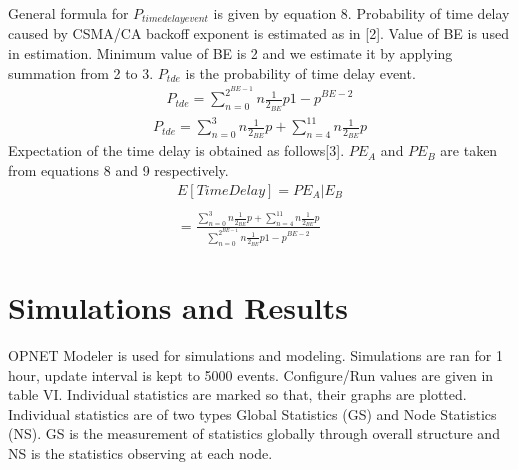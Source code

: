 \documentclass[11pt, conference, compsocconf, onecolumn]{IEEEtran}
\begin{document}
\indent General formula for $P_{time delay event}$ is given by equation 8. Probability of time delay caused by CSMA/CA backoff exponent is estimated as in [2]. Value of BE is used in estimation. Minimum value of BE is 2 and we estimate it by applying summation from 2 to 3. $P_{tde}$ is the probability of time delay event.
\\
\begin{eqnarray}
P_{tde}= \sum_{n=0}^{2^{BE-1}} n\frac{1}{2_{BE}}p{1-p}^{BE-2}
\end{eqnarray}
\begin{eqnarray}
P_{tde}= \sum_{n=0}^{3} n\frac{1}{2_{BE}}p + \sum _{n=4}^{11} n\frac{1}{2_{BE}}p
\end{eqnarray}
\indent Expectation of the time delay is obtained as follows[3]. $P{E_{A}}$ and $P{E_{B}}$ are taken from equations 8 and 9 respectively.
\\
\begin{eqnarray}
E[Time Delay]=P{E_{A}|E_{B}}\\
\nonumber\\
= \frac{\sum_{n=0}^{3} n\frac{1}{2_{BE}}p + \sum _{n=4}^{11} n\frac{1}{2_{BE}}p}{\sum_{n=0}^{2^{BE-1}} n\frac{1}{2_{BE}}p{1-p}^{BE-2}}
\end{eqnarray}
\section{Simulations and Results}
OPNET Modeler is used for simulations and modeling. Simulations are ran for 1 hour, update interval is kept to 5000 events. Configure/Run values are given in table VI. Individual statistics are marked so that, their graphs are plotted. Individual statistics are of two types Global Statistics (GS) and Node Statistics (NS). GS is the measurement of statistics globally through overall structure and NS is the statistics observing at each node.
\end{document}
